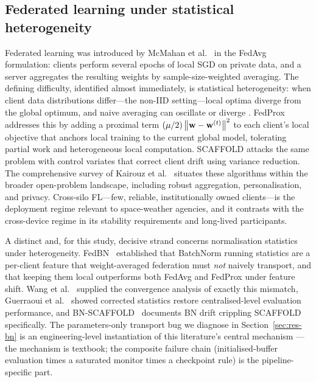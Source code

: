 \subsection{Federated learning under statistical heterogeneity}

Federated learning was introduced by McMahan et
al.~\cite{mcmahan2017} in the FedAvg formulation: clients perform
several epochs of local SGD on private data, and a server aggregates
the resulting weights by sample-size-weighted averaging. The defining
difficulty, identified almost immediately, is statistical
heterogeneity: when client data distributions differ---the non-IID
setting---local optima diverge from the global optimum, and naive
averaging can oscillate or diverge \cite{zhao2018}. FedProx
\cite{li2020} addresses this by adding a proximal term
$(\mu/2)\left\lVert \mathbf{w}-\mathbf{w}^{(t)} \right\rVert^{2}$ to each client's local objective that
anchors local training to the current global model, tolerating partial
work and heterogeneous local computation. SCAFFOLD \cite{karimireddy2020}
attacks the same problem with control variates that correct client
drift using variance reduction. The comprehensive survey of Kairouz et
al.~\cite{kairouz2021} situates these algorithms within the broader
open-problem landscape, including robust aggregation, personalisation,
and privacy. Cross-silo FL---few, reliable, institutionally owned
clients---is the deployment regime relevant to space-weather agencies,
and it contrasts with the cross-device regime in its stability
requirements and long-lived participants.

A distinct and, for this study, decisive strand concerns normalisation
statistics under heterogeneity. FedBN~\cite{li2021fedbn} established
that BatchNorm running statistics are a per-client feature that
weight-averaged federation must \emph{not} naively transport, and that
keeping them local outperforms both FedAvg and FedProx under feature
shift. Wang et al.~\cite{wang2023bn} supplied the convergence analysis
of exactly this mismatch, Guerraoui et al.~\cite{guerraoui2024bn}
showed corrected statistics restore centralised-level evaluation
performance, and BN-SCAFFOLD~\cite{bnscaffold2024} documents BN drift
crippling SCAFFOLD specifically. The parameters-only transport bug we
diagnose in Section~\ref{sec:res-bn} is an engineering-level
instantiation of this literature's central mechanism --- the mechanism
is textbook; the composite failure chain (initialised-buffer evaluation
times a saturated monitor times a checkpoint rule) is the
pipeline-specific part.

